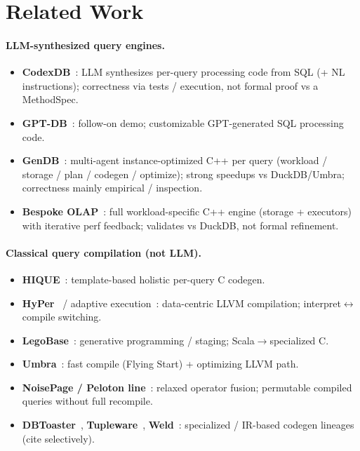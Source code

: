 \documentclass[sigconf, nonacm]{acmart}
\begin{document}
\section{Related Work}

\paragraph{LLM-synthesized query engines.}
\begin{itemize}
  \item \textbf{CodexDB}~\cite{Trummer2022CodexDB}: LLM synthesizes per-query processing code from SQL (+ NL instructions); correctness via tests / execution, not formal proof vs a MethodSpec.
  \item \textbf{GPT-DB}~\cite{Trummer2023GPTDB}: follow-on demo; customizable GPT-generated SQL processing code.
  \item \textbf{GenDB}~\cite{Lao2026GenDB}: multi-agent instance-optimized C++ per query (workload / storage / plan / codegen / optimize); strong speedups vs DuckDB/Umbra; correctness mainly empirical / inspection.
  \item \textbf{Bespoke OLAP}~\cite{Wehrstein2026Bespoke}: full workload-specific C++ engine (storage + executors) with iterative perf feedback; validates vs DuckDB, not formal refinement.
\end{itemize}

\paragraph{Classical query compilation (not LLM).}
\begin{itemize}
  \item \textbf{HIQUE}~\cite{Krikellas2010HIQUE}: template-based holistic per-query C codegen.
  \item \textbf{HyPer}~\cite{Neumann2011Hyper} / adaptive execution~\cite{Kohn2018Adaptive}: data-centric LLVM compilation; interpret$\leftrightarrow$compile switching.
  \item \textbf{LegoBase}~\cite{Klonatos2014LegoBase}: generative programming / staging; Scala$\to$specialized C.
  \item \textbf{Umbra}~\cite{Kersten2021UmbraFlyingStart}: fast compile (Flying Start) + optimizing LLVM path.
  \item \textbf{NoisePage / Peloton line}~\cite{Menon2017Relaxed,Menon2020Permutable}: relaxed operator fusion; permutable compiled queries without full recompile.
  \item \textbf{DBToaster}~\cite{Ahmad2012DBToaster}, \textbf{Tupleware}~\cite{Crotty2015Tupleware}, \textbf{Weld}~\cite{Palkar2018Weld}: specialized / IR-based codegen lineages (cite selectively).
\end{itemize}
\end{document}
